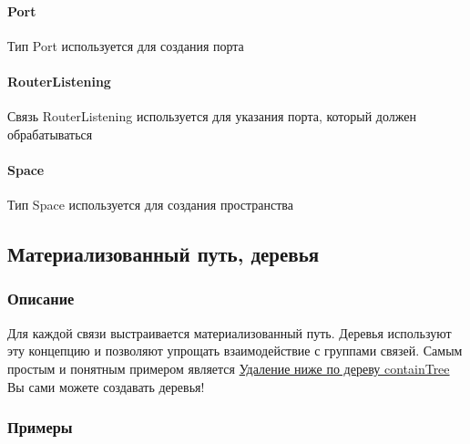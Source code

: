 \documentclass{article}
\begin{document}
\paragraph*{Port}
Тип Port\hypertarget{Port.Def}{} используется для создания порта
\paragraph*{RouterListening}
Связь RouterListening\hypertarget{RouterListening.Def}{} используется для указания порта, который должен обрабатываться
\paragraph*{Space}
Тип Space\hypertarget{Space.Def}{} используется для создания пространства

\subsection{Материализованный путь, деревья}
\subsubsection{Описание}
Для каждой связи выстраивается материализованный путь. Деревья используют эту концепцию и позволяют упрощать взаимодействие с группами связей.
Самым простым и понятным примером является \hyperlink{containTree.Deletion.Example}{Удаление ниже по дереву containTree}
Вы сами можете создавать деревья!
\subsubsection{Примеры}
\end{document}
